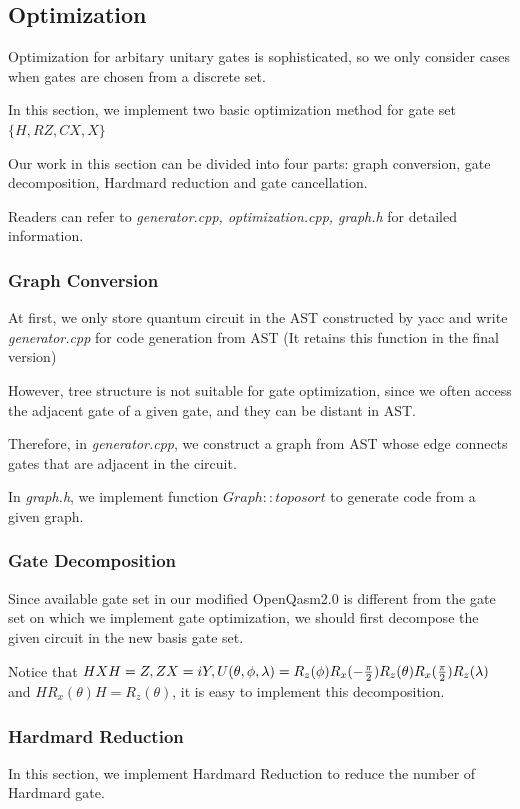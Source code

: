 \subsection{Optimization}

Optimization \cite{Nam_2018} for arbitary unitary gates is sophisticated, so we only consider cases when gates are chosen from a discrete set.

In this section, we implement two basic optimization method for gate set $\{H, RZ, CX, X\}$

Our work in this section can be divided into four parts: graph conversion, gate decomposition, Hardmard reduction and gate cancellation.

Readers can refer to \textit{generator.cpp, optimization.cpp, graph.h} for detailed information.
\subsubsection{Graph Conversion}

At first, we only store quantum circuit in the AST constructed by yacc and write \textit{generator.cpp} for code generation from AST (It retains this function in the final version)

However, tree structure is not suitable for gate optimization, since we often access the adjacent gate of a given gate, and they can be distant in AST.

Therefore, in \textit{generator.cpp}, we construct a graph from AST whose edge connects gates that are adjacent in the circuit.

In \textit{graph.h}, we implement function $Graph::toposort$ to generate code from a given graph.

\subsubsection{Gate Decomposition}
Since available gate set in our modified OpenQasm2.0 is different from the gate set on which we implement gate optimization, we should first decompose the given circuit in the new basis gate set.

Notice that $HXH = Z, ZX = iY, U(\theta, \phi, \lambda) = R_z(\phi)R_x(-\frac{\pi}{2})R_z(\theta)R_x(\frac{\pi}{2})R_z(\lambda)\\$ and $HR_x(\theta)H = R_z(\theta)$, it is easy to implement this decomposition.

    \subsubsection{Hardmard Reduction}
    In this section, we implement Hardmard Reduction to reduce the number of Hardmard gate.

